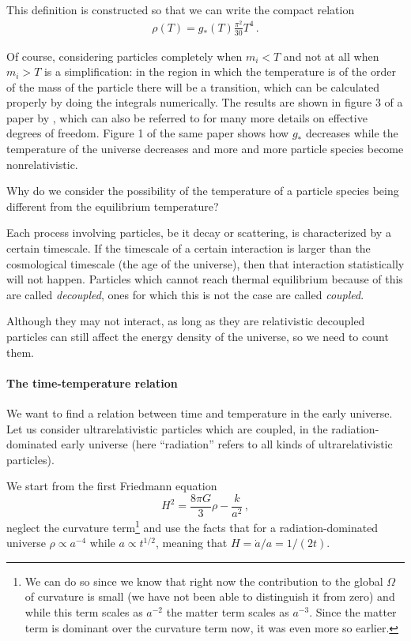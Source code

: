 \documentclass[main.tex]{subfiles}
\begin{document}
This definition is constructed so that we can write the compact relation 
%
\begin{align} \label{eq:radiation-energy-density-effective-dof}
\rho (T) = g_*(T) \frac{\pi^2}{30} T^{4}
\,.
\end{align}

Of course, considering particles completely when \(m_i < T\) and not at all when \(m_i > T\) is a simplification: in the region in which the temperature is of the order of the mass of the particle there will be a transition, which can be calculated properly by doing the integrals numerically. The results are shown in figure 3 of a paper by \textcite[]{husdalEffectiveDegreesFreedom2016}, which can also be referred to for many more details on effective degrees of freedom.
Figure 1 of the same paper shows how \(g_*\) decreases while the temperature of the universe decreases and more and more particle species become nonrelativistic. 

Why do we consider the possibility of the temperature of a particle species being different from the equilibrium temperature?
 
Each process involving particles, be it decay or scattering, is characterized by a certain timescale.
If the timescale of a certain interaction is larger than the cosmological timescale (the age of the universe), then that interaction statistically will not happen.
Particles which cannot reach thermal equilibrium because of this are called \emph{decoupled}, ones for which this is not the case are called \emph{coupled}.

Although they may not interact, as long as they are relativistic decoupled particles can still affect the energy density of the universe, so we need to count them. 

\paragraph{The time-temperature relation}

We want to find a relation between time and temperature in the early universe.
Let us consider ultrarelativistic particles which are coupled, in the radiation-dominated early universe (here ``radiation'' refers to all kinds of ultrarelativistic particles). 


We start from the first Friedmann equation
%
\begin{equation}
  H^2= \frac{8 \pi G}{3} \rho - \frac{k}{a^2}
\,,
\end{equation}
%
neglect the curvature term\footnote{We can do so since we know that right now the contribution to the global \(\Omega \) of curvature is small (we have not been able to distinguish it from zero) and while this term scales as \(a^{-2}\) the matter term scales as \(a^{-3}\). Since the matter term is dominant over the curvature term now, it was even more so earlier.} and use the facts that for a radiation-dominated universe \(\rho \propto a^{-4}\) while \(a \propto t^{1/2}\), meaning that \(H = \dot{a} / a =  1/ (2t)\).
\end{document}
